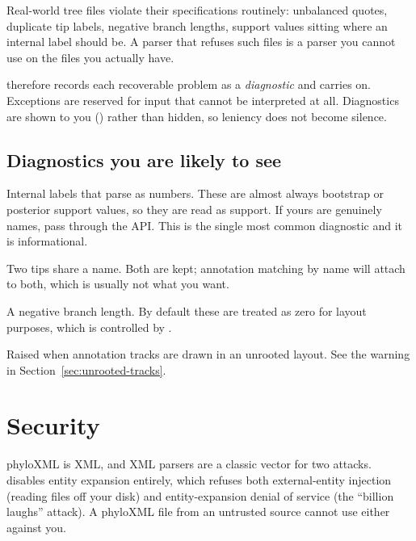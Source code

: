 Real-world tree files violate their specifications routinely: unbalanced quotes,
duplicate tip labels, negative branch lengths, support values sitting where an
internal label should be. A parser that refuses such files is a parser you cannot
use on the files you actually have.

\app{} therefore records each recoverable problem as a \emph{diagnostic} and
carries on. Exceptions are reserved for input that cannot be interpreted at all.
Diagnostics are shown to you () rather than hidden, so leniency does
not become silence.

\subsection{Diagnostics you are likely to see}

\begin{description}[style=nextline,leftmargin=0pt,labelindent=0pt,labelwidth=0pt]
  \item[\cmd{newick.internal-label-ambiguous}]
    Internal labels that parse as numbers. These are almost always bootstrap or
    posterior support values, so they are read as support. If yours are genuinely
    names, pass  through the API. This is the single
    most common diagnostic and it is informational.
  \item[\cmd{newick.duplicate-name}]
    Two tips share a name. Both are kept; annotation matching by name will attach
    to both, which is usually not what you want.
  \item[\cmd{newick.negative-length}]
    A negative branch length. By default these are treated as zero for layout
    purposes, which is controlled by .
  \item[\cmd{compose.approximate-band-space}]
    Raised when annotation tracks are drawn in an unrooted layout. See the
    warning in Section~\ref{sec:unrooted-tracks}.
\end{description}

\section{Security}

phyloXML is XML, and XML parsers are a classic vector for two attacks. \app{}
disables entity expansion entirely, which refuses both external-entity injection
(reading files off your disk) and entity-expansion denial of service (the
``billion laughs'' attack). A phyloXML file from an untrusted source cannot use
either against you.

